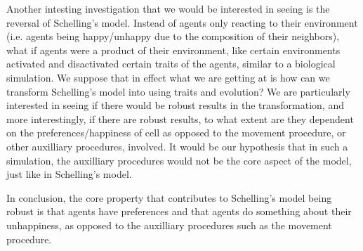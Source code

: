 \documentclass[11pt,twoside]{amsart}
\theoremstyle{theorem}
\theoremstyle{definition}
\theoremstyle{remark}
\begin{document}
Another intesting investigation that we would be interested in seeing is the reversal of Schelling's model.
Instead of agents only reacting to their environment (i.e. agents being happy/unhappy due to the composition of their neighbors), what if agents were a product of their environment, like certain environments activated and disactivated certain traits of the agents, similar to a biological simulation. 
We suppose that in effect what we are getting at is how can we transform Schelling's model into using traits and evolution?
We are particularly interested in seeing if there would be robust results in the transformation, and more interestingly, if there are robust results, to what extent are they dependent on the preferences/happiness of cell as opposed to the movement procedure, or other auxilliary procedures, involved.
It would be our hypothesis that in such a simulation, the auxilliary procedures would not be the core aspect of the model, just like in Schelling's model.

In conclusion, the core property that contributes to Schelling's model being robust is that agents have preferences and that agents do something about their unhappiness, as opposed to the auxilliary procedures such as the movement procedure. 
\printbibliography
\end{document}
